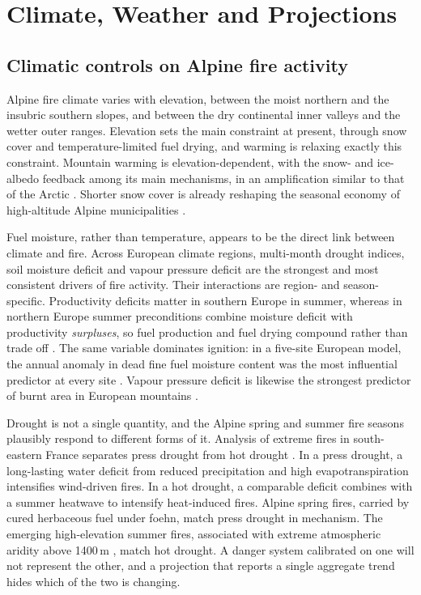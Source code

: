 \documentclass[11pt,a4paper]{article}
\begin{document}
\section{Climate, Weather and Projections}
\label{sec:climate}

\subsection{Climatic controls on Alpine fire activity}

Alpine fire climate varies with elevation, between the moist northern and the insubric southern slopes, and between the dry continental inner valleys and the wetter outer ranges. Elevation sets the main constraint at present, through snow cover and temperature-limited fuel drying, and warming is relaxing exactly this constraint. Mountain warming is elevation-dependent, with the snow- and ice-albedo feedback among its main mechanisms, in an amplification similar to that of the Arctic \citep{rangwala_climate_2012}. Shorter snow cover is already reshaping the seasonal economy of high-altitude Alpine municipalities \citep{pede_mountain_2022}.

Fuel moisture, rather than temperature, appears to be the direct link between climate and fire. Across European climate regions, multi-month drought indices, soil moisture deficit and vapour pressure deficit are the strongest and most consistent drivers of fire activity. Their interactions are region- and season-specific. Productivity deficits matter in southern Europe in summer, whereas in northern Europe summer preconditions combine moisture deficit with productivity \emph{surpluses}, so fuel production and fuel drying compound rather than trade off \citep{miller_compounding_2025}. The same variable dominates ignition: in a five-site European model, the annual anomaly in dead fine fuel moisture content was the most influential predictor at every site \citep{gelabert_assessing_2025}. Vapour pressure deficit is likewise the strongest predictor of burnt area in European mountains \citep{beloiu_climatedriven_2026}.

Drought is not a single quantity, and the Alpine spring and summer fire seasons plausibly respond to different forms of it. Analysis of extreme fires in south-eastern France separates press drought from hot drought \citep{ruffault_extreme_2018}. In a press drought, a long-lasting water deficit from reduced precipitation and high evapotranspiration intensifies wind-driven fires. In a hot drought, a comparable deficit combines with a summer heatwave to intensify heat-induced fires. Alpine spring fires, carried by cured herbaceous fuel under foehn, match press drought in mechanism. The emerging high-elevation summer fires, associated with extreme atmospheric aridity above 1400\,m \citep{beloiu_climatedriven_2026}, match hot drought. A danger system calibrated on one will not represent the other, and a projection that reports a single aggregate trend hides which of the two is changing.
\end{document}
